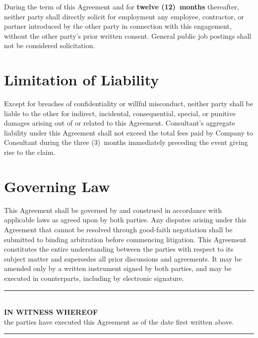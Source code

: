 \documentclass{toospoint}
\begin{document}
During the term of this Agreement and for \textbf{twelve (12)~months}
thereafter, neither party shall directly solicit for employment any employee,
contractor, or partner introduced by the other party in connection with this
engagement, without the other party's prior written consent. General public
job postings shall not be considered solicitation.

\section{Limitation of Liability}

Except for breaches of confidentiality or willful misconduct, neither party
shall be liable to the other for indirect, incidental, consequential, special,
or punitive damages arising out of or related to this Agreement. Consultant's
aggregate liability under this Agreement shall not exceed the total fees paid
by Company to Consultant during the three (3)~months immediately preceding the
event giving rise to the claim.

\section{Governing Law}

This Agreement shall be governed by and construed in accordance with applicable
laws as agreed upon by both parties. Any disputes arising under this Agreement
that cannot be resolved through good-faith negotiation shall be submitted to
binding arbitration before commencing litigation. This Agreement constitutes
the entire understanding between the parties with respect to its subject
matter and supersedes all prior discussions and agreements. It may be amended
only by a written instrument signed by both parties, and may be executed in
counterparts, including by electronic signature.

\vspace{28pt}

\begin{center}
  {\color{TPBorder}\rule{0.7\textwidth}{0.5pt}}\\[6pt]
  {\sffamily\bfseries\color{TPDark}IN WITNESS WHEREOF}\\[4pt]
  {\sffamily\small\color{TPGray}the parties have executed this Agreement as of the date first written above.}\\[6pt]
  {\color{TPBorder}\rule{0.7\textwidth}{0.5pt}}
\end{center}
\end{document}
